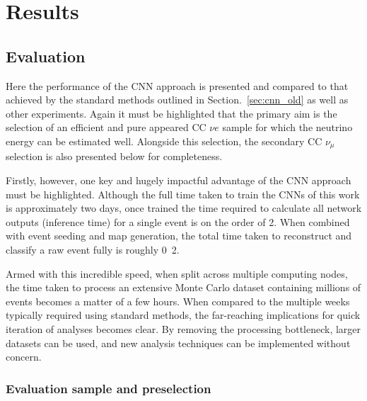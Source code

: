 \chapter{Results} %
\label{chap:results} %

\section{Evaluation} %
\label{sec:results_eval} %

Here the performance of the CNN approach is presented and compared to that achieved by the
standard \chips methods outlined in Section.~\ref{sec:cnn_old} as well as other experiments. Again
it must be highlighted that the primary aim is the selection of an efficient and pure appeared CC
$\nu{e}$ sample for which the neutrino energy can be estimated well. Alongside this selection, the
secondary CC $\nu_{\mu}$ selection is also presented below for completeness.

Firstly, however, one key and hugely impactful advantage of the CNN approach must be highlighted.
Although the full time taken to train the CNNs of this work is approximately two days, once
trained the time required to calculate all network outputs (inference time) for a single event is
on the order of \unit{2}{}. When combined with event seeding and map generation, the
total time taken to reconstruct and classify a raw event fully is roughly
\unit{0.2}{}.

Armed with this incredible speed, when split across multiple computing nodes, the time taken to
process an extensive Monte Carlo dataset containing millions of events becomes a matter of a few
hours. When compared to the multiple weeks typically required using standard methods, the
far-reaching implications for quick iteration of analyses becomes clear. By removing the
processing bottleneck, larger datasets can be used, and new analysis techniques can be implemented
without concern.

\subsection{Evaluation sample and preselection} %
\label{sec:results_eval_sample} %

